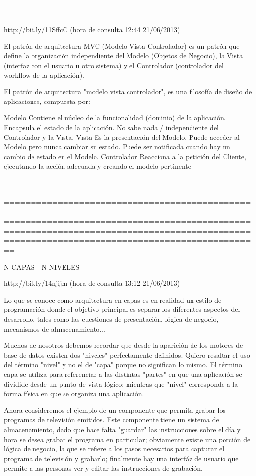  -----------------------------------------------------------------------------------------------------------------------------------------
 
 http://bit.ly/11SffcC (hora de consulta 12:44 21/06/2013)
 
 El patrón de arquitectura MVC (Modelo Vista Controlador) es un patrón que define la organización independiente del Modelo (Objetos de 
 Negocio), la Vista (interfaz con el usuario u otro sistema) y el Controlador (controlador del workflow de la aplicación).
 
 El patrón de arquitectura "modelo vista controlador", es una filosofía de diseño de aplicaciones, compuesta por:

Modelo
    Contiene el núcleo de la funcionalidad (dominio) de la aplicación. 
    Encapsula el estado de la aplicación. 
    No sabe nada / independiente del Controlador y la Vista. 
Vista
    Es la presentación del Modelo. 
    Puede acceder al Modelo pero nunca cambiar su estado. 
    Puede ser notificada cuando hay un cambio de estado en el Modelo. 
Controlador
    Reacciona a la petición del Cliente, ejecutando la acción adecuada y creando el modelo pertinente 
    
============================================================================================================================================
============================================================================================================================================

N CAPAS - N NIVELES

http://bit.ly/14njijm  (hora de consulta 13:12 21/06/2013)


Lo que se conoce como arquitectura en capas es en realidad un estilo de programación donde el objetivo principal es separar los diferentes 
aspectos del desarrollo, tales como las cuestiones de presentación, lógica de negocio, mecanismos de almacenamiento...

Muchos de nosotros debemos recordar que desde la aparición de los motores de base de datos existen dos "niveles" perfectamente definidos. 
Quiero resaltar el uso del término "nivel" y no el de "capa" porque no significan lo mismo. El término capa se utiliza para referenciar a 
las distintas "partes" en que una aplicación se dividide desde un punto de vista lógico; mientras que "nivel" corresponde a la forma física
en que se organiza una aplicación.

Ahora consideremos el ejemplo de un componente que permita grabar los programas de televisión emitidos. Este componente tiene un sistema de 
almacenamiento, dado que hace falta "guardar" las instrucciones sobre el día y hora se desea grabar el programa en particular; obviamente 
existe una porción de lógica de negocio, la que se refiere a los pasos necesarios para capturar el programa de televisión y grabarlo; 
finalmente hay una interfáz de usuario que permite a las personas ver y editar las instrucciones de grabación.

